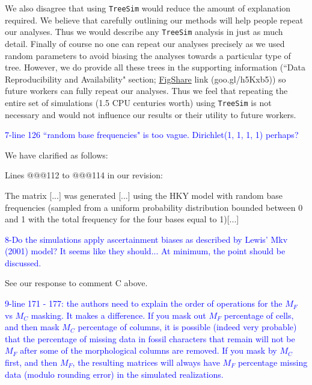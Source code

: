 \documentclass[11pt]{letter}
\begin{document}
\begin{letter}{}
We also disagree that using \texttt{TreeSim} would reduce the amount of explanation required. We believe that carefully outlining our methods will help people repeat our analyses. Thus we would describe any \texttt{TreeSim} analysis in just as much detail.
Finally of course no one can repeat our analyses precisely as we used random parameters to avoid biasing the analyses towards a particular type of tree. However, we do provide all these trees in the supporting information (``Data Reproducibility and Availability" section; \href{http://figshare.com/articles/Effect_of_missing_data_on_topological_inference_using_a_total_evidence_approach/1306861}{FigShare} link (goo.gl/h5Kxb5)) so future workers can fully repeat our analyses. Thus we feel that repeating the entire set of simulations (1.5 CPU centuries worth) using \texttt{TreeSim} is not necessary and would not influence our results or their utility to future workers.


\textcolor{blue}{7-line 126 ``random base frequencies" is too vague. Dirichlet(1, 1, 1, 1) perhaps?}

We have clarified as follows:

Lines @@@112 to @@@114 in our revision:

\hfill\begin{minipage}{\dimexpr\textwidth-1cm}
The matrix [...] was generated [...] using the HKY model with random base frequencies (sampled from a uniform probability distribution bounded between 0 and 1 with the total frequency for the four bases equal to 1)[...]
\end{minipage}


\textcolor{blue}{8-Do the simulations apply ascertainment biases as described by Lewis' Mkv (2001) model? It seems like they should... At minimum, the point should be discussed.}

See our response to comment C above.


\textcolor{blue}{9-line 171 - 177: the authors need to explain the order of operations for the $M_F$ vs $M_C$ masking. It makes a difference. If you mask out $M_F$ percentage of cells, and then mask $M_C$ percentage of columns, it is possible (indeed very probable) that the percentage of missing data in fossil characters that remain will not be $M_F$ after some of the morphological columns are removed. If you mask by $M_C$ first, and then $M_F$, the resulting matrices will always have $M_F$ percentage missing data (modulo rounding error) in the simulated realizations.}


\end{letter}
\end{document}
